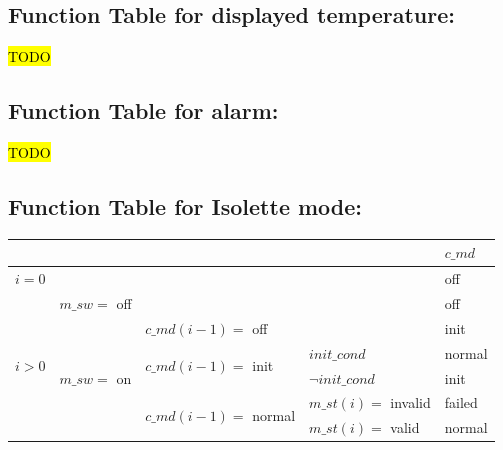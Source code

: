 \documentclass[fontsize=12pt,paper=letter,twoside]{scrartcl}
\begin{document}
\subsection{Function Table for displayed temperature: }
\hl{TODO}
\subsection{Function Table for alarm: }
\hl{TODO}
\subsection{Function Table for Isolette mode: }
\begin{table}[htb]
\centering
\begin{tabular}{llll|l|}
\cline{5-5}
                                                        &                                                  &                                                           &                    & $c\_md$  \\ \hline
\multicolumn{4}{|l|}{$i = 0$}                                                                                                                                                                 & off    \\ \hline
\multicolumn{1}{|l|}{\multirow{8}{*}{$i > 0$}} & \multicolumn{3}{l|}{$m\_sw =$ off}                                                                                                  & off    \\ \cline{2-5}
\multicolumn{1}{|l|}{}                                  & \multicolumn{1}{l|}{\multirow{7}{*}{$m\_sw =$ on}} & \multicolumn{2}{l|}{$c\_md(i-1) =$ off}                                          & init   \\ \cline{3-5}
\multicolumn{1}{|l|}{}                                  & \multicolumn{1}{l|}{}                            & \multicolumn{1}{l|}{\multirow{2}{*}{$c\_md(i-1) =$ init}}   & $init\_cond$ \footnotemark        & normal \\ \cline{4-5}
\multicolumn{1}{|l|}{}                                  & \multicolumn{1}{l|}{}                            & \multicolumn{1}{l|}{}                                     & $\neg init\_cond$     & init   \\ \cline{3-5}
\multicolumn{1}{|l|}{}                                  & \multicolumn{1}{l|}{}                            & \multicolumn{1}{l|}{\multirow{2}{*}{$c\_md(i-1) =$ normal}} & $m\_st(i) =$ invalid & failed   \\ \cline{4-5}
\multicolumn{1}{|l|}{}                                  & \multicolumn{1}{l|}{}                            & \multicolumn{1}{l|}{}                                     & $m\_st(i) =$ valid   & normal \\ \cline{3-5}

\end{tabular}
\end{table}
\end{document}
